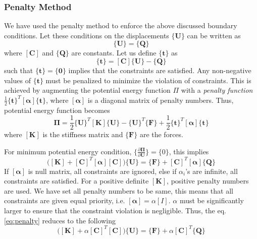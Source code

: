 \documentclass[10pt]{article}
\newcommand{\e}[1]{\textbf{#1}}
\begin{document}
\subsubsection{Penalty Method}
\label{sec:pbc}
We have used the penalty method to enforce the above discussed boundary conditions. Let these conditions on the displacements $\{\e U\}$ can be written as
\begin{equation*}
[\textbf{C}]\{\textbf{U}\} = \{\textbf{Q}\}
\end{equation*}
where $[\textbf{C}]$ and $\{\textbf{Q}\}$ are constants. Let us define $\{\textbf{t}\}$ as
\begin{equation*}
\{\textbf{t}\} = [\textbf{C}]\{\textbf{U}\} - \{\textbf{Q}\}
\end{equation*}
such that $\{\textbf{t}\} = \{\textbf{0}\}$ implies that the constraints are satisfied. Any non-negative values of $\{\textbf{t}\}$ must be penalized to minimize the violation of constraints. This is achieved by augmenting the potential energy function\cite{Book:Cook} $\Pi$ with a \textit{penalty function} $\frac{1}{2}\{\textbf{t}\}^T[\bm\alpha]\{\textbf{t}\}$, where $[\bm\alpha]$ is a diagonal matrix of penalty numbers. Thus, potential energy function becomes
\begin{equation}
\bm\Pi = \frac{1}{2}\{\e U\}^T[\e K]\{\e U\} - \{\e U\}^T\{\e F\} + \frac{1}{2}\{\textbf{t}\}^T[\bm\alpha]\{\textbf{t}\}
\end{equation}
where $[\e K]$ is the stiffness matrix and $\{\e F\}$ are the forces.\par
For minimum potential energy condition, $\{\frac{\partial\bm\Pi}{\partial\e U}\} = \{0\}$, this implies
\begin{equation}
\label{eq:penalty}
\bigg([\e K]+[\e C]^T[\bm\alpha][\e C]\bigg)\{\e U\} = \{\e F\} + [\e C]^T[\bm\alpha]\{\e Q\}
\end{equation}
If $[\bm\alpha]$ is null matrix, all constraints are ignored, else if $\alpha_i$'s are infinite, all constraints are satisfied. For a positive definite $[\e K]$, positive penalty numbers are used. We have set all penalty numbers to be same, this means that all constraints are given equal priority, i.e. $[\bm\alpha] = \alpha[I]$. $\alpha$ must be significantly larger to ensure that the constraint violation is negligible. Thus, the eq. \eqref{eq:penalty} reduces to the following
\begin{equation}
\label{eq:penalty1}
\bigg([\e K]+\alpha[\e C]^T[\e C]\bigg)\{\e U\} = \{\e F\} + \alpha[\e C]^T\{\e Q\}
\end{equation}
\end{document}
